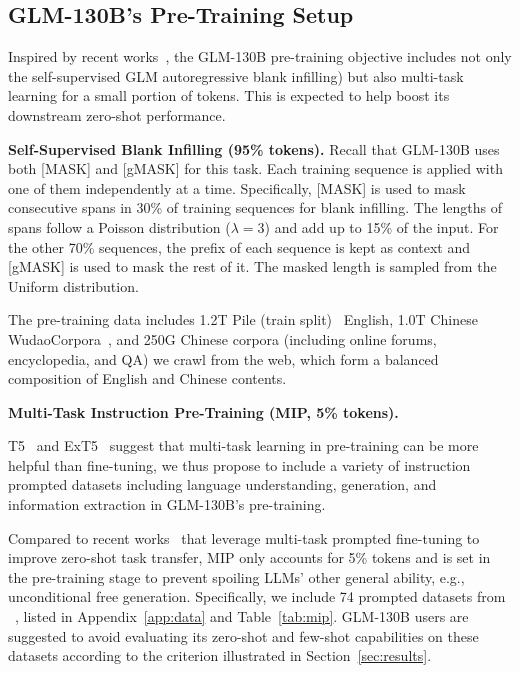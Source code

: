 \subsection{GLM-130B's Pre-Training Setup} \label{sec:training_objective}

Inspired by recent works~\citep{aribandi2022ext5,wei2022finetuned,sanh2022multitask}, the GLM-130B pre-training objective includes not only the self-supervised GLM autoregressive blank infilling) but also multi-task learning for a small portion of tokens. This is expected to help boost its downstream zero-shot performance. 

\textbf{Self-Supervised Blank Infilling (95\% tokens).} Recall that GLM-130B uses both [MASK] and [gMASK] for this task. Each training sequence is applied with one of them independently at a time. Specifically, [MASK] is used to mask consecutive spans in 30\% of training sequences for blank infilling. The lengths of spans follow a Poisson distribution ($\lambda=3$) and add up to 15\% of the input. For the other 70\% sequences, the prefix of each sequence is kept as context and [gMASK] is used to mask the rest of it. The masked length is sampled from the Uniform distribution.

The pre-training data includes 1.2T Pile (train split)~\citep{gao2020pile} English, 1.0T Chinese WudaoCorpora~\citep{yuan2021wudaocorpora}, and 250G Chinese corpora (including online forums, encyclopedia, and QA) we crawl from the web, which form a balanced composition of English and Chinese contents.

\textbf{Multi-Task Instruction Pre-Training (MIP, 5\% tokens).}

T5~\citep{raffel2020exploring} and ExT5~\citep{aribandi2022ext5} suggest that multi-task learning in pre-training can be more helpful than fine-tuning, we thus propose to include a variety of instruction prompted datasets including language understanding, generation, and information extraction in GLM-130B's pre-training.

Compared to recent works~\citep{wei2022finetuned,sanh2022multitask} that leverage multi-task prompted fine-tuning to improve zero-shot task transfer, MIP only accounts for 5\% tokens and is set in the pre-training stage to prevent spoiling LLMs' other general ability, e.g., unconditional free generation. Specifically, we include 74 prompted datasets from ~\citep{sanh2022multitask,wang2022deepstruct}, listed in Appendix~\ref{app:data} and Table~\ref{tab:mip}. 
GLM-130B users are suggested to {avoid evaluating its zero-shot and few-shot capabilities on these datasets} according to the criterion illustrated in Section~\ref{sec:results}.

